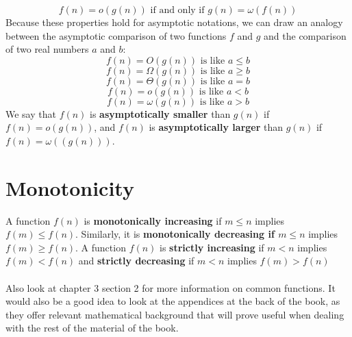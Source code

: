 \documentclass{article}
\begin{document}
\begin{equation*}
f(n) = o{(g(n))} \text{ if and only if } g(n) = \omega{(f(n))}
\end{equation*}
Because these properties hold for asymptotic notations, we can draw an analogy between the asymptotic comparison of two functions $f$ and $g$ and the comparison of two real numbers $a$ and $b$:
\begin{equation*}
f(n) = O{(g(n))} \text{ is like } a \leq b
\end{equation*}
\begin{equation*}
f(n) = \Omega{(g(n))} \text{ is like } a \geq b
\end{equation*}
\begin{equation*}
f(n) = \Theta{(g(n))} \text{ is like } a = b
\end{equation*}
\begin{equation*}
f(n) = o{(g(n))} \text{ is like } a < b
\end{equation*}
\begin{equation*}
f(n) = \omega{(g(n))} \text{ is like } a > b
\end{equation*}
We say that $f(n)$ is \textbf{asymptotically smaller} than $g(n)$ if $f(n) = o(g(n))$, and $f(n)$ is \textbf{asymptotically larger} than $g(n)$ if $f(n) = \omega{((g(n)))}$.

\newpage

\section*{Monotonicity}
A function $f(n)$ is \textbf{monotonically increasing} if $m \leq n$ implies $f(m) \leq f(n)$. Similarly, it is \textbf{monotonically decreasing if $m \leq n$} implies $f(m) \geq f(n)$. A function $f(n)$ is \textbf{strictly increasing} if $m < n$ implies $f(m) < f(n)$ and \textbf{strictly decreasing} if $m < n$ implies $f(m) > f(n)$
\\ \\
Also look at chapter 3 section 2 for more information on common functions. It would also be a good idea to look at the appendices at the back of the book, as they offer relevant mathematical background that will prove useful when dealing with the rest of the material of the book.
\end{document}
